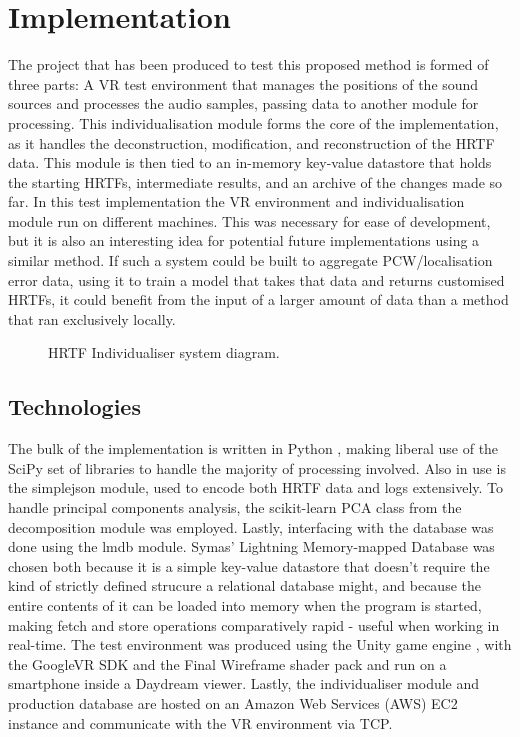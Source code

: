 \section{Implementation}
The project that has been produced to test this proposed method is formed of three parts: A VR test environment that manages the positions of the sound sources and processes the audio samples, passing data to another module for processing. This individualisation module forms the core of the implementation, as it handles the deconstruction, modification, and reconstruction of the HRTF data. This module is then tied to an in-memory key-value datastore that holds the starting HRTFs, intermediate results, and an archive of the changes made so far. In this test implementation the VR environment and individualisation module run on different machines. This was necessary for ease of development, but it is also an interesting idea for potential future implementations using a similar method. If such a system could be built to aggregate PCW/localisation error data, using it to train a model that takes that data and returns customised HRTFs, it could benefit from the input of a larger amount of data than a method that ran exclusively locally. 

\begin{figure}
	\caption{HRTF Individualiser system diagram. }
\end{figure}

\subsection{Technologies}
The bulk of the implementation is written in Python \citep{GuidovanRossum}, making liberal use of the SciPy\citep{Jones} set of libraries to handle the majority of processing involved. Also in use is the simplejson\citep{Ippolito} module, used to encode both HRTF data and logs extensively. To handle principal components analysis, the scikit-learn\citep{scikit-learn} PCA class from the decomposition module was employed. Lastly, interfacing with the database was done using the lmdb module\citep{lmdb}. Symas' Lightning Memory-mapped Database \citep{openldap} was chosen both because it is a simple key-value datastore that doesn't require the kind of strictly defined strucure a relational database might, and because the entire contents of it can be loaded into memory when the program is started, making fetch and store operations comparatively rapid - useful when working in real-time. The test environment was produced using the Unity game engine \citep{engine9unity}, with the GoogleVR SDK \citep{DevelopersGoogle2016} and the Final Wireframe \citep{finalwireframe} shader pack and run on a smartphone inside a Daydream\citep{Google2016} viewer. Lastly, the individualiser module and production database are hosted on an Amazon Web Services (AWS) EC2 instance and communicate with the VR environment via TCP.

